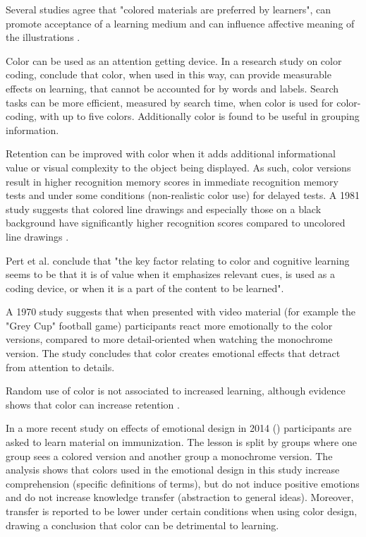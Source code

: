 		Several studies agree that "colored materials are preferred by learners", can promote acceptance of a learning medium and can influence affective meaning of the illustrations \cite[p.25]{Pett1996}.
		
		Color can be used as an attention getting device. In a research study on color coding, \cite{Lamberski1983} conclude that color, when used in this way, can provide measurable effects on learning, that cannot be accounted for by words and labels. 
		Search tasks can be more efficient, measured by search time, when color is used for color-coding, with up to five colors. Additionally color is found to be useful in grouping information. 
		
		Retention can be improved with color when it adds additional informational value or visual complexity to the object being displayed. As such, color versions result in higher recognition memory scores in immediate recognition memory tests and under some conditions (non-realistic color use) for delayed tests. A 1981 study suggests that colored line drawings and especially those on a black background have significantly higher recognition scores compared to uncolored line drawings \cite{Pett1996}.
		
		Pert et al. conclude that "the key factor relating to color and cognitive learning seems to be that it is of value when it emphasizes relevant cues, is used as a coding device, or when it is a part of the content to be learned".
		
		A 1970 study suggests that when presented with video material (for example the "Grey Cup" football game) participants react more emotionally to the color versions, compared to more detail-oriented when watching the monochrome version.	The study concludes that color creates emotional effects that detract from attention to details.
		
		Random use of color is not associated to increased learning, although evidence shows that color can increase retention \cite{Pett1996}.

		In a more recent study on effects of emotional design in 2014 (\cite{Plass2014}) participants are asked to learn material on immunization. The lesson is split by groups where one group sees a colored version and another group a monochrome version. The analysis shows that colors used in the emotional design in this study increase comprehension (specific definitions of terms), but do not induce positive emotions and do not increase knowledge transfer (abstraction to general ideas). Moreover, transfer is reported to be lower under certain conditions when using color design, drawing a conclusion that color can be detrimental to learning.
				
